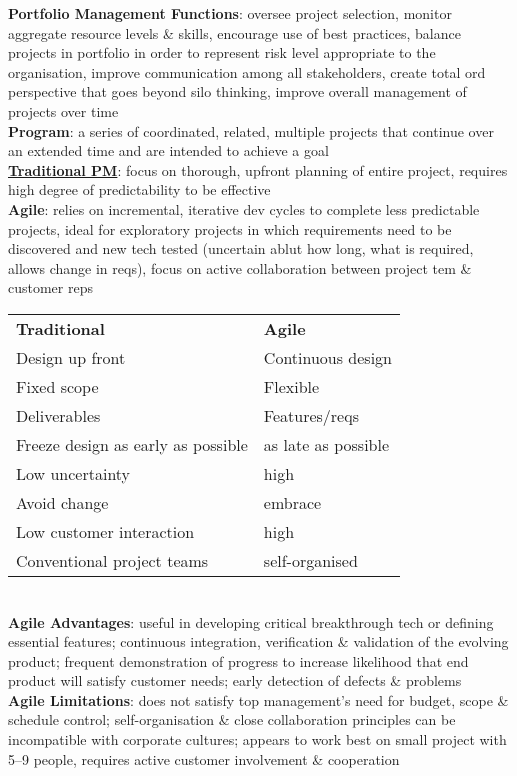 \documentclass[a4paper]{article}
\begin{document}
\begin{multicols}{3}
        \textbf{Portfolio Management Functions}: oversee project selection, monitor aggregate resource levels \& skills, encourage use of best practices, balance projects in portfolio in order to represent risk level appropriate to the organisation, improve communication among all stakeholders, create total ord perspective that goes beyond silo thinking, improve overall management of projects over time\\
        \textbf{Program}: a series of coordinated, related, multiple projects that continue over an extended time and are intended to achieve a goal\\
        \underline{\textbf{Traditional PM}}: focus on thorough, upfront planning of entire project, requires high degree of predictability to be effective\\
        \textbf{Agile}: relies on incremental, iterative dev cycles to complete less predictable projects, ideal for exploratory projects in which requirements need to be discovered and new tech tested (uncertain ablut how long, what is required, allows change in reqs), focus on active collaboration between project tem \& customer reps\\
        \begin{tabular}{l l}
            \textbf{Traditional} & \textbf{Agile}\\
            Design up front & Continuous design\\
            Fixed scope & Flexible\\
            Deliverables & Features/reqs\\
            Freeze design as early as possible & as late as possible\\
            Low uncertainty & high\\
            Avoid change & embrace\\
            Low customer interaction & high\\
            Conventional project teams & self-organised\\
        \end{tabular}\\
        \textbf{Agile Advantages}: useful in developing critical breakthrough tech or defining essential features; continuous integration, verification \& validation of the evolving product; frequent demonstration of progress to increase likelihood that end product will satisfy customer needs; early detection of defects \& problems\\
        \textbf{Agile Limitations}: does not satisfy top management's need for budget, scope \& schedule control; self-organisation \& close collaboration principles can be incompatible with corporate cultures; appears to work best on small project with 5--9 people, requires active customer involvement \& cooperation\\

\end{multicols}
\end{document}
